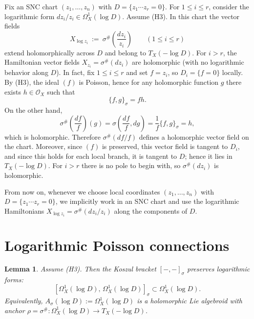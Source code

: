 \documentclass[11pt]{amsart}
\theoremstyle{plain}
\newtheorem{lemma}[theorem]{Lemma}
\theoremstyle{definition}
\theoremstyle{definition}
\newcommand{\OO}{\mathcal{O}}
\begin{document}
Fix an SNC chart $(z_1,\dots,z_n)$ with $D=\{z_1\cdots z_r=0\}$. For $1\le i\le r$, consider the logarithmic form
$dz_i/z_i \in \Omega_X^1(\log D)$.
Assume \textup{(H3)}. In this  chart the vector fields
$$
X_{\log z_i}\ :=\ \sigma^\# \left(\frac{dz_i}{z_i}\right)
\qquad (1\le i\le r)
$$
extend holomorphically across $D$ and belong to $T_X(-\log D)$. For $i>r$, the Hamiltonian vector fields
$X_{z_i}=\sigma^\#(dz_i)$ are holomorphic (with no logarithmic behavior along $D$).
In fact, fix $1\le i\le r$ and set $f=z_i$, so $D_i=\{f=0\}$ locally. By \textup{(H3)}, the ideal $(f)$ is Poisson, hence
for any holomorphic function $g$ there exists $h\in\OO_X$ such that
$$
\{f,g\}_\sigma = f h.
$$
On the other hand,
$$
\sigma^\# \left(\frac{df}{f}\right)(g)
=
\sigma \left(\frac{df}{f},dg\right)
=
\frac{1}{f}\{f,g\}_\sigma
=
h,
$$
which is holomorphic. Therefore $\sigma^\#(df/f)$ defines a holomorphic vector field on the chart.
Moreover, since $(f)$ is preserved, this vector field is tangent to $D_i$, and since this holds for each local branch,
it is tangent to $D$; hence it lies in $T_X(-\log D)$.
For $i>r$ there is no pole to begin with, so $\sigma^\#(dz_i)$ is holomorphic.
 

 

From now on, whenever we choose local coordinates $(z_1,\ldots,z_n)$ with $D=\{z_1\cdots z_r=0\}$, we implicitly
work in an SNC chart and use the logarithmic Hamiltonians $X_{\log z_i}=\sigma^\#(dz_i/z_i)$ along the components of $D$.

\section{Logarithmic Poisson connections}\label{sec:log-poisson-connections}
\begin{lemma}\label{lem:log-cotangent-lie}
Assume \textup{(H3)}. Then the Koszul bracket $[-,-]_\sigma$ preserves logarithmic forms:
\[
[\Omega_X^1(\log D),\,\Omega_X^1(\log D)]_\sigma \subset \Omega_X^1(\log D).
\]
Equivalently, $A_\sigma(\log D):=\Omega_X^1(\log D)$ is a holomorphic Lie algebroid with anchor
$\rho=\sigma^\#:\Omega_X^1(\log D)\to T_X(-\log D)$.
\end{lemma}
\end{document}

